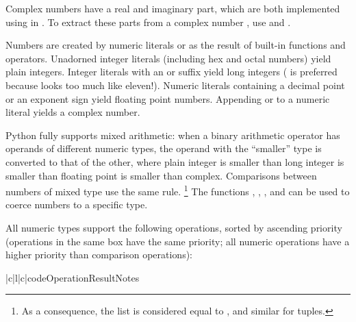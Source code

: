 Complex numbers have a real and imaginary part, which are both
implemented using  in \C{}.  To extract these parts from
a complex number , use  and .  

Numbers are created by numeric literals or as the result of built-in
functions and operators.  Unadorned integer literals (including hex
and octal numbers) yield plain integers.  Integer literals with an 
or  suffix yield long integers
( is preferred because  looks too much like eleven!).
Numeric literals containing a decimal point or an exponent sign yield
floating point numbers.  Appending  or  to a numeric
literal yields a complex number.

Python fully supports mixed arithmetic: when a binary arithmetic
operator has operands of different numeric types, the operand with the
``smaller'' type is converted to that of the other, where plain
integer is smaller than long integer is smaller than floating point is
smaller than complex.
Comparisons between numbers of mixed type use the same rule.%
\footnote{As a consequence, the list \code{[1, 2]} is considered equal
	to \code{[1.0, 2.0]}, and similar for tuples.}
The functions , , ,
and  can be used
to coerce numbers to a specific type.

All numeric types support the following operations, sorted by
ascending priority (operations in the same box have the same
priority; all numeric operations have a higher priority than
comparison operations):

\begin{tableiii}{|c|l|c|}{code}{Operation}{Result}{Notes}
  \hline
  \hline
  \hline
\end{tableiii}

